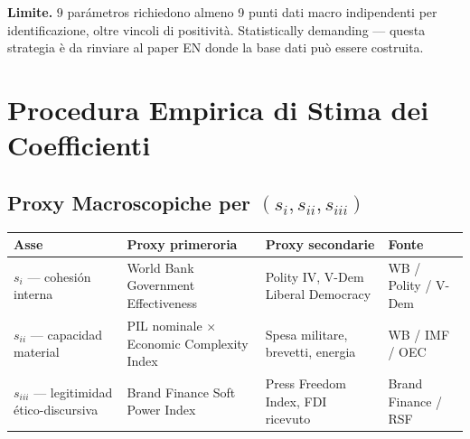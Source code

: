 \Conj{} \textbf{Limite.} \(9\) parámetros richiedono almeno 9 punti dati
macro indipendenti per identificazione, oltre vincoli di positività.
Statistically demanding --- questa strategia è da rinviare al paper EN
donde la base dati può essere costruita.



\section{Procedura Empirica di Stima dei
Coefficienti}\label{procedura-empirica-di-stima-dei-coefficienti}

\subsection{\texorpdfstring{Proxy Macroscopiche per
\((s_i, s_{ii}, s_{iii})\)}{Proxy Macroscopiche per (s\_i, s\_\{ii\}, s\_\{iii\})}}\label{proxy-macroscopiche-per-s_i-s_ii-s_iii}

{\def\LTcaptype{none} %
{\small\begin{longtable}[]{@{}
  >{\raggedright\arraybackslash}p{}
  >{\raggedright\arraybackslash}p{}
  >{\raggedright\arraybackslash}p{}
  >{\raggedright\arraybackslash}p{}@{}}
\toprule\noalign{}
\begin{minipage}[b]{\linewidth}\raggedright
Asse
\end{minipage} & \begin{minipage}[b]{\linewidth}\raggedright
Proxy primeroria
\end{minipage} & \begin{minipage}[b]{\linewidth}\raggedright
Proxy secondarie
\end{minipage} & \begin{minipage}[b]{\linewidth}\raggedright
Fonte
\end{minipage} \\
\midrule\noalign{}
\endhead
\bottomrule\noalign{}
\endlastfoot
\(s_i\) --- cohesión interna & World Bank Government Effectiveness &
Polity IV, V-Dem Liberal Democracy & WB / Polity / V-Dem \\
\(s_{ii}\) --- capacidad material & PIL nominale $\times$ Economic Complexity
Index & Spesa militare, brevetti, energia & WB / IMF / OEC \\
\(s_{iii}\) --- legitimidad ético-discursiva & Brand Finance Soft Power
Index & Press Freedom Index, FDI ricevuto & Brand Finance / RSF \\
\end{longtable}}
}

